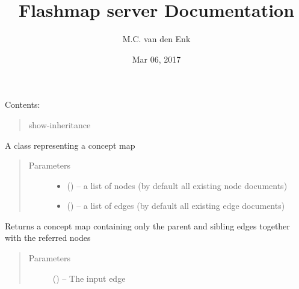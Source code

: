 \documentclass[letterpaper,10pt,english]{sphinxmanual}
\title{Flashmap server Documentation}
\date{Mar 06, 2017}
\author{M.C. van den Enk}
\begin{document}
\maketitle
\sphinxtableofcontents
{}\label{\detokenize{index::doc}}
Contents:


\begin{quote}\begin{description}
\item[{show-inheritance}] \leavevmode
\end{description}\end{quote}

\begin{fulllineitems}
\label{\detokenize{concept_map:concept_map.ConceptMap}}
A class representing a concept map
\begin{quote}\begin{description}
\item[{Parameters}] \leavevmode\begin{itemize}
\item {} 
 (\sphinxstyleliteralemphasis{)}\sphinxstyleliteralemphasis{}) -- a list of nodes (by default all existing node documents)

\item {} 
 (\sphinxstyleliteralemphasis{)}\sphinxstyleliteralemphasis{}) -- a list of edges (by default all existing edge documents)

\end{itemize}

\end{description}\end{quote}

\begin{fulllineitems}
\label{\detokenize{concept_map:concept_map.ConceptMap.get_partial_map}}
Returns a concept map containing only the parent and sibling edges together with the referred nodes
\begin{quote}\begin{description}
\item[{Parameters}] \leavevmode
{} ({\hyperref[\detokenize{edge:edge.Edge}]{}}) -- The input edge


\end{description}
\end{quote}
\end{fulllineitems}
\end{fulllineitems}
\end{document}
